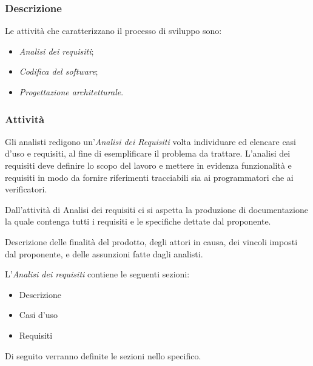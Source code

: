 		\subsubsection{Descrizione}
		Le attività che caratterizzano il processo di sviluppo sono:
		\begin{itemize}
			\item \textit{Analisi dei requisiti};
			\item \textit{Codifica del software};
			\item \textit{Progettazione architetturale}.
		\end{itemize}
		
		\subsubsection{Attività}
		Gli analisti redigono un'\textit{Analisi dei Requisiti} volta  individuare ed elencare casi d'uso e requisiti, al fine di esemplificare il problema da trattare.
		L'analisi dei requisiti deve definire lo scopo del lavoro e mettere in evidenza funzionalità e requisiti in modo da fornire riferimenti tracciabili sia ai programmatori che ai verificatori.
		
		Dall'attività di Analisi dei requisiti ci si aspetta la produzione di documentazione la quale contenga tutti i requisiti e le specifiche dettate dal proponente.
	
		Descrizione delle finalità del prodotto, degli attori in causa, dei vincoli imposti dal proponente, e delle assunzioni fatte dagli analisti.
		
		
		L'\textit{Analisi dei requisiti} contiene le seguenti sezioni:
		\begin{itemize}
			\item Descrizione
			\item Casi d'uso
			\item Requisiti
		\end{itemize}
		Di seguito verranno definite le sezioni nello specifico.
		
